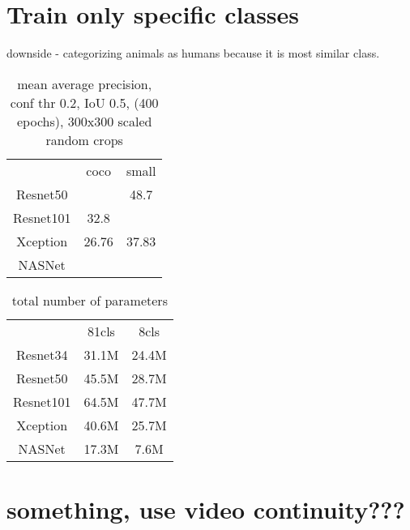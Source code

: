 \section{Train only specific classes}
downside - categorizing animals as humans because it is most similar class.
\begin{table}
    \begin{tabular}{c|c|c}
         & coco & small \\
        Resnet50 & & 48.7\\
        Resnet101 & 32.8 & \\
        Xception & 26.76 & 37.83\\
        NASNet & & \\
    \end{tabular}
    \caption{mean average precision, conf thr 0.2, IoU 0.5,  (400 epochs), 300x300 scaled random crops}
    \label{tab:map}
\end{table}


\begin{table}
    \begin{tabular}{c|c|c}
     & 81cls & 8cls  \\
    Resnet34 & 31.1M & 24.4M\\
    Resnet50 & 45.5M & 28.7M\\
    Resnet101 & 64.5M & 47.7M \\
    Xception & 40.6M & 25.7M \\
    NASNet & 17.3M & 7.6M \\
    \end{tabular}
    \caption{total number of parameters}
    \label{tab:parameters}
\end{table}



\section{something, use video continuity???}
